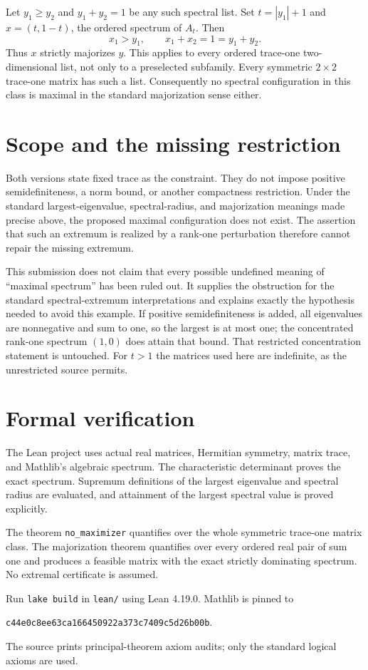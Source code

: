 \documentclass[11pt]{article}
\begin{document}
Let $y_1\geq y_2$ and $y_1+y_2=1$ be any such spectral list. Set $t=|y_1|+1$ and $x=(t,1-t)$, the ordered spectrum of $A_t$. Then
\[
 x_1>y_1,\qquad x_1+x_2=1=y_1+y_2.
\]
Thus $x$ strictly majorizes $y$. This applies to every ordered trace-one two-dimensional list, not only to a preselected subfamily. Every symmetric $2\times2$ trace-one matrix has such a list. Consequently no spectral configuration in this class is maximal in the standard majorization sense either.

\section*{Scope and the missing restriction}
Both versions state fixed trace as the constraint. They do not impose positive semidefiniteness, a norm bound, or another compactness restriction. Under the standard largest-eigenvalue, spectral-radius, and majorization meanings made precise above, the proposed maximal configuration does not exist. The assertion that such an extremum is realized by a rank-one perturbation therefore cannot repair the missing extremum.

This submission does not claim that every possible undefined meaning of ``maximal spectrum'' has been ruled out. It supplies the obstruction for the standard spectral-extremum interpretations and explains exactly the hypothesis needed to avoid this example. If positive semidefiniteness is added, all eigenvalues are nonnegative and sum to one, so the largest is at most one; the concentrated rank-one spectrum $(1,0)$ does attain that bound. That restricted concentration statement is untouched. For $t>1$ the matrices used here are indefinite, as the unrestricted source permits.

\section*{Formal verification}
The Lean project uses actual real matrices, Hermitian symmetry, matrix trace, and Mathlib's algebraic spectrum. The characteristic determinant proves the exact spectrum. Supremum definitions of the largest eigenvalue and spectral radius are evaluated, and attainment of the largest spectral value is proved explicitly.

The theorem \texttt{no\_maximizer} quantifies over the whole symmetric trace-one matrix class. The majorization theorem quantifies over every ordered real pair of sum one and produces a feasible matrix with the exact strictly dominating spectrum. No extremal certificate is assumed.

Run \texttt{lake build} in \texttt{lean/} using Lean 4.19.0. Mathlib is pinned to
\begin{center}\small\texttt{c44e0c8ee63ca166450922a373c7409c5d26b00b}.\end{center}
The source prints principal-theorem axiom audits; only the standard logical axioms are used.
\end{document}
